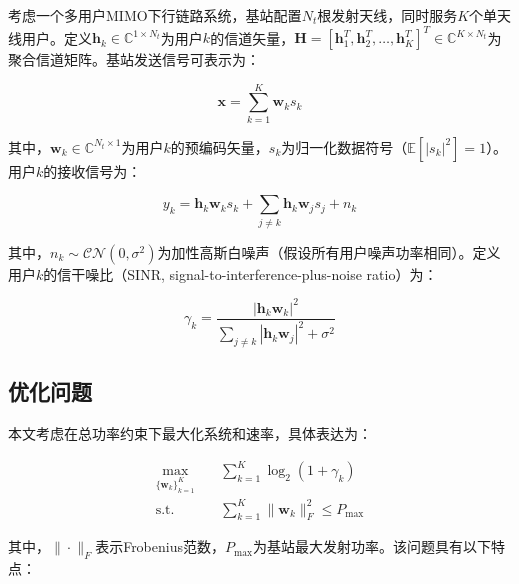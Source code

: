 \documentclass[twoside, 10pt]{ctexart}
\begin{document}
考虑一个多用户MIMO下行链路系统，基站配置$N_t$根发射天线，同时服务$K$个单天线用户。定义$\mathbf{h}_k \in \mathbb{C}^{1 \times N_t}$为用户$k$的信道矢量，$\mathbf{H} = [\mathbf{h}_1^T, \mathbf{h}_2^T, \ldots, \mathbf{h}_K^T]^T \in \mathbb{C}^{K \times N_t}$为聚合信道矩阵。基站发送信号可表示为：\vspace{-1em}

\begin{equation}
\mathbf{x} = \sum_{k=1}^K \mathbf{w}_k s_k
\end{equation}

其中，$\mathbf{w}_k \in \mathbb{C}^{N_t \times 1}$为用户$k$的预编码矢量，$s_k$为归一化数据符号（$\mathbb{E}[|s_k|^2] = 1$）。用户$k$的接收信号为：\vspace{-2em}

\begin{equation}
y_k = \mathbf{h}_k \mathbf{w}_k s_k + \sum_{j \neq k} \mathbf{h}_k \mathbf{w}_j s_j + n_k
\end{equation}

其中，$n_k \sim \mathcal{CN}(0, \sigma^2)$为加性高斯白噪声（假设所有用户噪声功率相同）。定义用户$k$的信干噪比（SINR, signal-to-interference-plus-noise ratio）为：\vspace{-1em}

\begin{equation}
\gamma_k = \frac{|\mathbf{h}_k \mathbf{w}_k|^2}{\sum_{j \neq k} |\mathbf{h}_k \mathbf{w}_j|^2 + \sigma^2}
\end{equation}

\subsection{优化问题}

本文考虑在总功率约束下最大化系统和速率，具体表达为：\vspace{-2em}

\begin{subequations}
\begin{align}
\max_{\{\mathbf{w}_k\}_{k=1}^K} \quad & \sum_{k=1}^K \log_2(1 + \gamma_k) \\
\text{s.t.} \quad & \sum_{k=1}^K \|\mathbf{w}_k\|_F^2 \le P_{\text{max}}
\end{align}
\label{eq:optimization}
\end{subequations}\vspace{-1em}

其中，$\|\cdot\|_F$表示Frobenius范数，$P_{\text{max}}$为基站最大发射功率。该问题具有以下特点：
\end{document}
